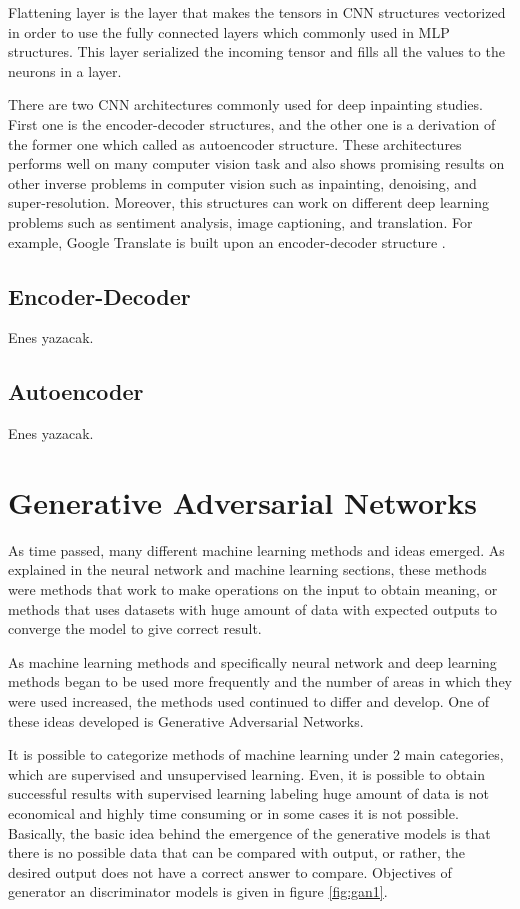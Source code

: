 Flattening layer is the layer that makes the tensors in CNN structures vectorized in order to use the fully connected layers which commonly used in MLP structures. This layer serialized the incoming tensor and fills all the values to the neurons in a layer.

There are two CNN architectures commonly used for deep inpainting studies. First one is the encoder-decoder structures, and the other one is a derivation of the former one which called as autoencoder structure. These architectures performs well on many computer vision task and also shows promising results on other inverse problems in computer vision such as inpainting, denoising, and super-resolution. Moreover, this structures can work on different deep learning problems such as sentiment analysis, image captioning, and translation. For example, Google Translate is built upon an encoder-decoder structure \cite{google_translate}.

\subsection{Encoder-Decoder}

Enes yazacak.

\subsection{Autoencoder}

Enes yazacak.

\section{Generative Adversarial Networks}

As time passed, many different machine learning methods and ideas emerged. As explained in the neural network and machine learning sections, these methods were methods that work to make operations on the input to obtain meaning, or methods that uses datasets with huge amount of data with expected outputs to converge the model to give correct result.

As machine learning methods and specifically neural network and deep learning methods began to be used more frequently and the number of areas in which they were used increased, the methods used continued to differ and develop. One of these ideas developed is Generative Adversarial Networks.

It is possible to categorize methods of machine learning under 2 main categories, which are supervised and unsupervised learning. Even, it is possible to obtain successful results with supervised learning labeling huge amount of data is not economical and highly time consuming or in some cases it is not possible. Basically, the basic idea behind the emergence of the generative models is that there is no possible data that can be compared with output, or rather, the desired output does not have a correct answer to compare. Objectives of generator an discriminator models is given in figure \ref{fig:gan1}.

